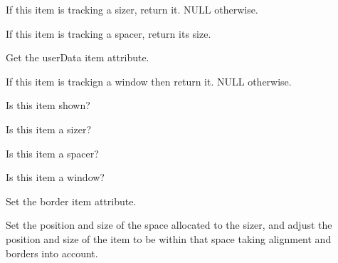 
If this item is tracking a sizer, return it.  NULL otherwise.


\label{wxsizeritemgetspacer}


If this item is tracking a spacer, return its size.


\label{wxsizeritemgetuserdata}


Get the userData item attribute.


\label{wxsizeritemgetwindow}


If this item is trackign a window then return it.  NULL otherwise.

\label{wxsizeritemisshown}


Is this item shown?


\label{wxsizeritemissizer}


Is this item a sizer?


\label{wxsizeritemisspacer}


Is this item a spacer?


\label{wxsizeritemiswindow}


Is this item a window?


\label{wxsizeritemsetborder}


Set the border item attribute.

\label{wxsizeritemsetdimension}


Set the position and size of the space allocated to the sizer, and
adjust the position and size of the item to be within that space
taking alignment and borders into account.


